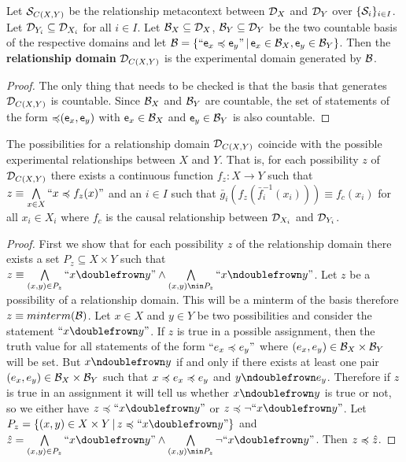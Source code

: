 \documentclass[11pt,letterpaper,fleqn]{memoir} %
\begin{document}
\begin{mathSection}
	\begin{defn}
		Let $\logCtx_{C(X,Y)}$ be the relationship metacontext between $\edomain_X$ and $\edomain_Y$ over $\{ \logCtx_i \}_{i \in I}$. Let $\edomain_{Y_i} \subseteq \edomain_{X_i}$ for all $i \in I$. Let $\basis_X \subseteq \edomain_X$,  $\basis_Y \subseteq \edomain_Y$ be the two countable basis of the respective domains and let $\basis = \{ ``\stmt[e]_x \narrower \stmt[e]_y" \, | \,  \stmt[e]_x \in \basis_X, \stmt[e]_y \in \basis_Y\}$. Then the \textbf{relationship domain} $\edomain_{C(X,Y)}$ is the experimental domain generated by $\basis$.
	\end{defn}
	\begin{proof}
		The only thing that needs to be checked is that the basis that generates $\edomain_{C(X,Y)}$ is countable. Since $\basis_X$ and $\basis_Y$ are countable, the set of statements of the form $\mathbin{\narrower}(\obs[e]_x, \obs[e]_y)$ with $\obs[e]_x \in \basis_X$ and $ \obs[e]_y \in \basis_Y$ is also countable.
	\end{proof}
\begin{prop}
	The possibilities for a relationship domain $\edomain_{C(X,Y)}$ coincide with the possible experimental relationships between $X$ and $Y$. That is, for each possibility $z$ of $\edomain_{C(X,Y)}$ there exists a continuous function $f_z : X \to Y$ such that $z\equiv\bigAND\limits_{x\in X} ``x \narrower f_z(x)"$ and an $i \in I$ such that $\bar{g}_i(f_z(\bar{f}_i^{-1}(x_i))) \equiv f_c (x_i)$ for all $x_i \in X_i$ where $f_c$ is the causal relationship between $\edomain_{X_i}$ and $\edomain_{Y_i}$.
\end{prop}
\begin{proof}
	First we show that for each possibility $z$ of the relationship domain there exists a set $P_z \subseteq X \times Y$ such that $z \equiv \bigAND\limits_{(x,y) \in P_z} ``x \comp y"  \AND \bigAND\limits_{(x,y) \nin P_z} ``x \ncomp y"$. Let $z$ be a possibility of a relationship domain. This will be a minterm of the basis therefore $z \equiv minterm(\basis)$. Let $x \in X$ and $y \in Y$ be two possibilities and consider the statement $``x \comp y"$. If $z$ is true in a possible assignment, then the truth value for all statements of the form $``e_x \narrower e_y"$ where $(e_x, e_y) \in \basis_X \times \basis_Y$ will be set. But $x \ncomp y$ if and only if there exists at least one pair $(e_x, e_y) \in \basis_X \times \basis_Y$ such that $x \narrower e_x \narrower e_y$ and $y \ncomp e_y$. Therefore if $z$ is true in an assignment it will tell us whether $x \ncomp y$ is true or not, so we either have $z \narrower ``x \comp y"$ or $z \narrower \NOT ``x \comp y"$. Let $P_z = \{ (x,y) \in X \times Y \, | \, z \narrower ``x \comp y" \}$ and $\hat{z} = \bigAND\limits_{(x,y) \in P_z} ``x \comp y" \AND  \bigAND\limits_{(x,y) \nin P_z} \NOT ``x \comp y" $. Then $z \narrower \hat{z}$.
	

\end{proof}
\end{mathSection}
\end{document}
